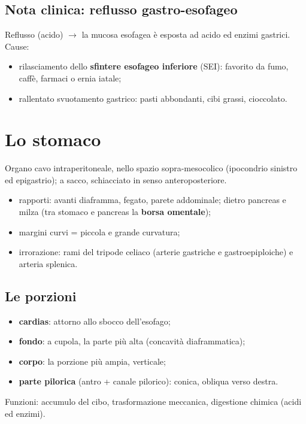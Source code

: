 \subsection{Nota clinica: reflusso gastro-esofageo}
Reflusso (acido) $\rightarrow$ la mucosa esofagea è esposta ad acido ed enzimi gastrici. Cause:
\begin{itemize}
  \item rilasciamento dello \textbf{sfintere esofageo inferiore} (SEI): favorito da fumo, caffè,
    farmaci o ernia iatale;
  \item rallentato svuotamento gastrico: pasti abbondanti, cibi grassi, cioccolato.
\end{itemize}

\section{Lo stomaco}

Organo cavo intraperitoneale, nello spazio sopra-mesocolico (ipocondrio sinistro ed epigastrio); a
sacco, schiacciato in senso anteroposteriore.
\begin{itemize}
  \item rapporti: avanti diaframma, fegato, parete addominale; dietro pancreas e milza (tra stomaco
    e pancreas la \textbf{borsa omentale});
  \item margini curvi = piccola e grande curvatura;
  \item irrorazione: rami del tripode celiaco (arterie gastriche e gastroepiploiche) e arteria
    splenica.
\end{itemize}

\subsection{Le porzioni}
\begin{itemize}
  \item \textbf{cardias}: attorno allo sbocco dell'esofago;
  \item \textbf{fondo}: a cupola, la parte più alta (concavità diaframmatica);
  \item \textbf{corpo}: la porzione più ampia, verticale;
  \item \textbf{parte pilorica} (antro + canale pilorico): conica, obliqua verso destra.
\end{itemize}
Funzioni: accumulo del cibo, trasformazione meccanica, digestione chimica (acidi ed enzimi).

